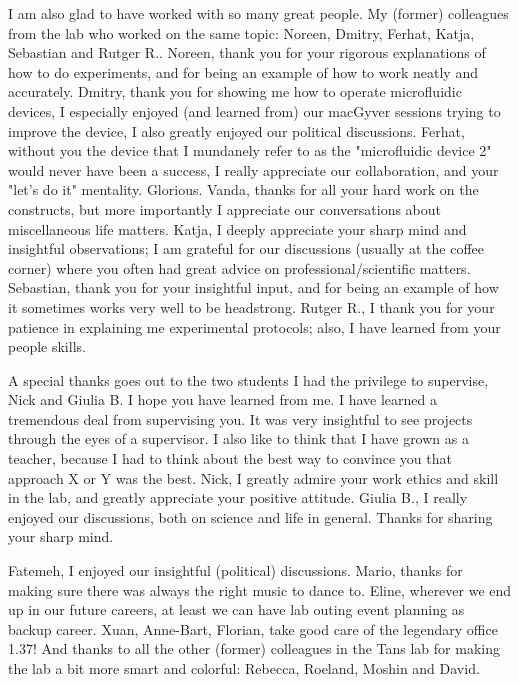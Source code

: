 I am also glad to have worked with so many great people.
%
My (former) colleagues from the lab who worked on the same topic: 
Noreen, Dmitry, Ferhat, Katja, Sebastian and Rutger R..
%
Noreen, thank you for your rigorous explanations of how to do experiments,
and for being an example of how to work neatly and accurately.
%
Dmitry, thank you for showing me how to operate microfluidic devices,
I especially enjoyed (and learned from) our macGyver sessions trying to improve the device, 
I also greatly enjoyed our political discussions.
%
Ferhat, without you the device that I mundanely refer to as the "microfluidic device 2" would never have been a success,
I really appreciate our collaboration, and your "let's do it" mentality. Glorious.
%
Vanda, thanks for all your hard work on the constructs, but more importantly
I appreciate our conversations about miscellaneous life matters. 
%
Katja, I deeply appreciate your sharp mind and insightful observations; I am grateful for 
our discussions (usually at the coffee corner) where you often had great advice on professional/scientific matters. 
%
Sebastian, thank you for your insightful input,
and for being an example of how it sometimes works very well to be headstrong. 
%
Rutger R., I thank you for your patience in explaining me experimental protocols; 
also, I have learned from your people skills.




A special thanks goes out to the two students I had the privilege to supervise, Nick and Giulia B.
%
I hope you have learned from me.
I have learned a tremendous deal from supervising you.
%
It was very insightful to see projects through the eyes of a supervisor. 
I also like to think that I have grown as a teacher, 
because I had to think about the best way to convince you that 
approach X or Y was the best.
%
Nick, I greatly admire your work ethics and skill in the lab, 
and greatly appreciate your positive attitude.
%
Giulia B., I really enjoyed our discussions,
both on science and life in general.
Thanks for sharing your sharp mind.


Fatemeh, %
I enjoyed our insightful (political) discussions.
%
Mario, thanks for making sure there was always the right music to dance to.
%
Eline, wherever we end up in our future careers, at least we can have lab outing event planning as backup career.
%
Xuan, Anne-Bart, Florian, take good care of the legendary office 1.37! 
%
And thanks to all the other (former) colleagues in the Tans lab for making the lab a bit more smart and colorful:
%
Rebecca, Roeland, Moshin and David.

